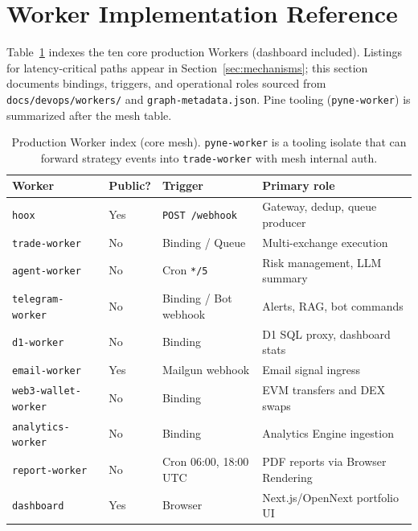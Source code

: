 \section{Worker Implementation Reference}
\label{sec:worker-deepdives}

Table~\ref{tab:worker-index} indexes the ten core production Workers (dashboard included). Listings for latency-critical paths appear in Section~\ref{sec:mechanisms}; this section documents bindings, triggers, and operational roles sourced from \texttt{docs/devops/workers/} and \texttt{graph-metadata.json}. Pine tooling (\texttt{pyne-worker}) is summarized after the mesh table.

\begin{table}[t]
  \centering
  \caption{Production Worker index (core mesh). \texttt{pyne-worker} is a tooling isolate that can forward strategy events into \texttt{trade-worker} with mesh internal auth.}
  \label{tab:worker-index}
  \small
  \begin{tabular*}{\linewidth}{@{\extracolsep{\fill}}llll@{}}
    \toprule
    \textbf{Worker} & \textbf{Public?} & \textbf{Trigger} & \textbf{Primary role} \\
    \midrule
    \texttt{hoox} & Yes & \texttt{POST /webhook} & Gateway, dedup, queue producer \\
    \texttt{trade-worker} & No & Binding / Queue & Multi-exchange execution \\
    \texttt{agent-worker} & No & Cron \texttt{*/5} & Risk management, LLM summary \\
    \texttt{telegram-worker} & No & Binding / Bot webhook & Alerts, RAG, bot commands \\
    \texttt{d1-worker} & No & Binding & D1 SQL proxy, dashboard stats \\
    \texttt{email-worker} & Yes & Mailgun webhook & Email signal ingress \\
    \texttt{web3-wallet-worker} & No & Binding & EVM transfers and DEX swaps \\
    \texttt{analytics-worker} & No & Binding & Analytics Engine ingestion \\
    \texttt{report-worker} & No & Cron 06:00, 18:00 UTC & PDF reports via Browser Rendering \\
    \texttt{dashboard} & Yes & Browser & Next.js/OpenNext portfolio UI \\
    \bottomrule
  \end{tabular*}
\end{table}

